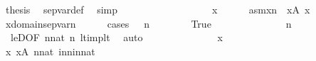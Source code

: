 \begin{isabellebody}
\ {\isacharquery}{\kern0pt}thesis\ \isamarkupfalse%
\ sep{\isacharunderscore}{\kern0pt}var{\isacharunderscore}{\kern0pt}def\ \isamarkupfalse%
\ simp\isanewline
\ \ \ \ \isamarkupfalse%
\isanewline
\ \ \isacommand{{\isacharbraceright}{\kern0pt}}\isamarkupfalse%
\isanewline
\ \ \isamarkupfalse%
\isanewline
\ \ \isacommand{{\isacharbraceleft}{\kern0pt}}\isamarkupfalse%
\isanewline
\ \ \ \ \isamarkupfalse%
\ x\isanewline
\ \ \ \ \isamarkupfalse%
\ asm{\isacharcolon}{\kern0pt}{\isachardoublequoteopen}x{\isasymin}{}{\isacharhash}{\kern0pt}{\isacharplus}{\kern0pt}n{\isachardoublequoteclose}\ \ {\isachardoublequoteopen}x{\isasymnotin}{\isacharquery}{\kern0pt}A{\isachardoublequoteclose}\ {\isachardoublequoteopen}x{\isacharless}{\kern0pt}{}{\isachardoublequoteclose}\isanewline
\ \ \ \ \isamarkupfalse%
\ \isamarkupfalse%
\ {\isachardoublequoteopen}x{\isasymin}domain{\isacharparenleft}{\kern0pt}sep{\isacharunderscore}{\kern0pt}var{\isacharparenleft}{\kern0pt}n{\isacharparenright}{\kern0pt}{\isacharparenright}{\kern0pt}{\isachardoublequoteclose}\isanewline
\ \ \ \ \isamarkupfalse%
\ {\isacharparenleft}{\kern0pt}cases\ {\isachardoublequoteopen}{}\ {\isasymle}\ n{\isachardoublequoteclose}{\isacharparenright}{\kern0pt}\isanewline
\ \ \ \ \ \ \isamarkupfalse%
\ True\isanewline
\ \ \ \ \ \ \isamarkupfalse%
\isanewline
\ \ \ \ \ \ \isamarkupfalse%
\ {\isachardoublequoteopen}{}{\isacharless}{\kern0pt}n{\isachardoublequoteclose}\ \isamarkupfalse%
\ \ leD{\isacharbrackleft}{\kern0pt}OF\ {\isacartoucheopen}n{\isasymin}nat{\isacartoucheclose}\ {\isacartoucheopen}{}{\isasymle}n{\isacartoucheclose}{\isacharbrackright}{\kern0pt}\ lt{\isacharunderscore}{\kern0pt}imp{\isacharunderscore}{\kern0pt}{}{\isacharunderscore}{\kern0pt}lt\ \isamarkupfalse%
\ auto\isanewline
\ \ \ \ \ \ \isamarkupfalse%
\isanewline
\ \ \ \ \ \ \isamarkupfalse%
\ {\isachardoublequoteopen}x{\isacharless}{\kern0pt}{}{\isachardoublequoteclose}\isanewline
\ \ \ \ \ \ \ \ \isamarkupfalse%
\ {\isacartoucheopen}x{\isacharless}{\kern0pt}{}{\isacartoucheclose}\ {\isacartoucheopen}x{\isasymnotin}{\isacharquery}{\kern0pt}A{\isacartoucheclose}\ {\isacartoucheopen}n{\isasymin}nat{\isacartoucheclose}\ in{\isacharunderscore}{\kern0pt}n{\isacharunderscore}{\kern0pt}in{\isacharunderscore}{\kern0pt}nat\isanewline

\end{isabellebody}
